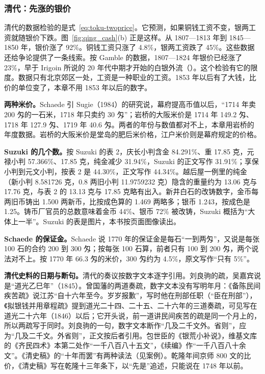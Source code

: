 \subsubsection{清代：先涨的银价}
清代的数据检验的是式~\eqref{eq:toku-twoprice}。它预测，如果铜钱工资不变，银两工资就随银价下跌。图~\ref{fig:qing_cash}(b) 正是这样。从 1807—1813 年到 1845—1850 年，银价涨了 92\%。铜钱工资只涨了 4.8\%，银两工资跌了 45\%\cite{gamble1943}。这些数据还给争论提供了一条线索。按 Gamble 的数据，1807—1824 年银价已经涨了 23\%，早于 Irigoin 所说的 20 年代中期才开始的白银外流（）。这个检验有它的限度。数据只有北京郊区一处，工资是一种职业的工资。1853 年以后有了大钱，比价的单位变了，本章不用 1853 年以后的数字。

\begin{deeper}[史料与几处不一致]
\textbf{两种米价。}Schaede 引 Sugie（1984）的研究说，幕府提高币值以后，“1714 年卖 200 匁的一石米，1718 年只卖约 30 匁”\cite{schaede1989}；岩桥的大阪米价是 1714 年 149.2 匁、1718 年 127.9 匁、1719 年 40.6 匁\cite{iwahashi1981}。两者的年份与数值都对不上，本章用岩桥的年度数据。岩桥的大阪米价是堂岛的肥后米价格，江户米价则是幕府规定的价格\cite{iwahashi1981}。

\textbf{Suzuki 的几个数。}按 Suzuki 的表 2，庆长小判含金 84.291\%、重 17.85 克，元禄小判 57.366\%、17.85 克，纯金减少 31.94\%，Suzuki 的正文写作 31.91\%；享保小判到元文小判，按表 2 是 44.30\%，正文写作 44.34\%\cite{suzuki2021}。越后屋一例里的纯金（新小判 8.581726 克，0.8 两旧小判 11.9759232 克）隐含的重量约为 13.06 克与 17.76 克，与表 2 的 13.13 克与 17.85 克略有出入。新井白石的改铸数字，金币每两旧币铸出 1.500 两新币，比按成色算的 1.469 两略多；银币 1.243，按成色是 1.25。铸币厂官员的总数意味着金币 44\%、银币 72\% 被改铸，Suzuki 概括为“大体上一半”。Suzuki 的表是图片，本书按页面图像读出。

\textbf{Schaede 的保证金。}Schaede 说 1770 年的保证金是每石“一到两匁”，又说是每张 100 石的合约 200 到 300 匁；按每张 100 石算，前者只有 100 到 200 匁，两个说法对不上。按 1770 年 66.3 匁的米价，300 匁约为 4.5\%，原文写作“只有 5\%”。

\textbf{清代史料的日期与断句。}清代的奏议按数字文本逐字引用。刘良驹的疏，吴嘉宾说是“道光乙巳年”（1845）\cite{xubiansheng}。曾国藩的两道奏疏，数字文本没有写明年月：《备陈民间疾苦疏》说江苏“自十六年至今。岁岁报歉”，写时他在刑部任职（“臣在刑部”），《拟银钱并用章程疏》提到道光二十四、二十五、二十六年的三道奏疏，可见写在道光二十六年（1846）以后；它开头说，前一道讲民间疾苦的疏是同一个月上的，所以两疏写于同时\cite{xubiansheng}。刘良驹的一句，数字文本断作“几及二千文外。省则”，应为“几及二千文。外省则”，正文按后者引用。包世臣的《银荒小补说》，维基文库的《齐民四术》本第二处作“一千八百八十五文”，《续编》作“一千八百八十余文”。《清史稿》的“十年而罢”有两种读法（见案例）。乾隆年间京师 800 文的比价，《清史稿》写在乾隆十三年条下，以“先是”追述，只能说在 1748 年以前。


\end{deeper}
